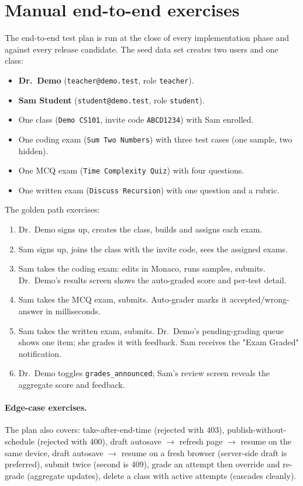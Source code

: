 \section{Manual end-to-end exercises}

The end-to-end test plan is run at the close of every implementation phase and against every release candidate. The seed data set creates two users and one class:

\begin{itemize}
  \item \textbf{Dr.\ Demo} (\texttt{teacher@demo.test}, role \texttt{teacher}).
  \item \textbf{Sam Student} (\texttt{student@demo.test}, role \texttt{student}).
  \item One class (\texttt{Demo CS101}, invite code \texttt{ABCD1234}) with Sam enrolled.
  \item One coding exam (\texttt{Sum Two Numbers}) with three test cases (one sample, two hidden).
  \item One MCQ exam (\texttt{Time Complexity Quiz}) with four questions.
  \item One written exam (\texttt{Discuss Recursion}) with one question and a rubric.
\end{itemize}

The golden path exercises:

\begin{enumerate}
  \item Dr.\ Demo signs up, creates the class, builds and assigns each exam.
  \item Sam signs up, joins the class with the invite code, sees the assigned exams.
  \item Sam takes the coding exam: edits in Monaco, runs samples, submits. Dr.\ Demo's results screen shows the auto-graded score and per-test detail.
  \item Sam takes the MCQ exam, submits. Auto-grader marks it accepted/wrong-answer in milliseconds.
  \item Sam takes the written exam, submits. Dr.\ Demo's pending-grading queue shows one item; she grades it with feedback. Sam receives the "Exam Graded" notification.
  \item Dr.\ Demo toggles \texttt{grades\_announced}; Sam's review screen reveals the aggregate score and feedback.
\end{enumerate}

\paragraph{Edge-case exercises.} The plan also covers: take-after-end-time (rejected with 403), publish-without-schedule (rejected with 400), draft autosave $\to$ refresh page $\to$ resume on the same device, draft autosave $\to$ resume on a fresh browser (server-side draft is preferred), submit twice (second is 409), grade an attempt then override and re-grade (aggregate updates), delete a class with active attempts (cascades cleanly).

